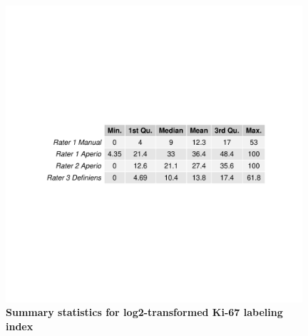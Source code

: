 \documentclass[final,3p,times]{elsarticle}
\begin{document}
\begin{figure}
\includegraphics[width = 11cm]{boxStat}
\centering
\caption{{\bf Summary statistics for log2-transformed Ki-67 labeling index}}
\label{boxStat}
\end{figure}
\end{document}
